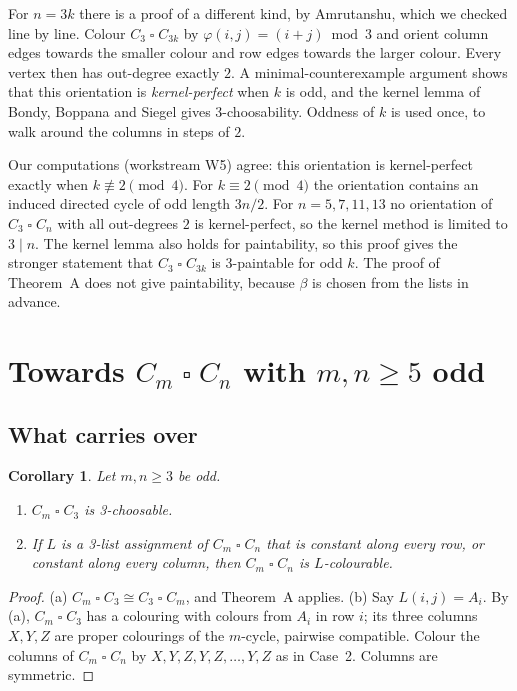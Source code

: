 \documentclass[11pt]{article}
\theoremstyle{plain}
\newtheorem{corollary}[theorem]{Corollary}
\theoremstyle{definition}
\theoremstyle{remark}
\newcommand{\T}{\mathbin{\square}}
\begin{document}
For $n = 3k$ there is a proof of a different kind, by Amrutanshu, which we checked line by
line. Colour $C_3 \T C_{3k}$ by $\varphi(i,j) = (i + j) \bmod 3$ and orient column edges towards
the smaller colour and row edges towards the larger colour. Every vertex then has out-degree
exactly $2$. A minimal-counterexample argument shows that this orientation is
\emph{kernel-perfect} when $k$ is odd, and the kernel lemma of Bondy, Boppana and Siegel gives
3-choosability. Oddness of $k$ is used once, to walk around the columns in steps of $2$.

Our computations (workstream W5) agree: this orientation is kernel-perfect exactly when
$k \not\equiv 2 \pmod 4$. For $k \equiv 2 \pmod 4$ the orientation contains an induced directed
cycle of odd length $3n/2$. For $n = 5, 7, 11, 13$ no orientation of $C_3 \T C_n$ with all
out-degrees $2$ is kernel-perfect, so the kernel method is limited to $3 \mid n$. The kernel lemma
also holds for paintability, so this proof gives the stronger statement that $C_3 \T C_{3k}$ is
3-paintable for odd $k$. The proof of Theorem~A does not give paintability, because $\beta$ is
chosen from the lists in advance.

\section{Towards $C_m \T C_n$ with $m, n \ge 5$ odd}\label{sec:general}

\subsection{What carries over}

\begin{corollary}\label{cor:rowconst}
Let $m, n \ge 3$ be odd.
\begin{enumerate}[label=(\alph*),nosep]
\item $C_m \T C_3$ is 3-choosable.
\item If $L$ is a 3-list assignment of $C_m \T C_n$ that is constant along every row, or constant
along every column, then $C_m \T C_n$ is $L$-colourable.
\end{enumerate}
\end{corollary}

\begin{proof}
(a) $C_m \T C_3 \cong C_3 \T C_m$, and Theorem~A applies. (b) Say $L(i, j) = A_i$. By (a),
$C_m \T C_3$ has a colouring with colours from $A_i$ in row $i$; its three columns $X, Y, Z$ are
proper colourings of the $m$-cycle, pairwise compatible. Colour the columns of $C_m \T C_n$ by
$X, Y, Z, Y, Z, \dots, Y, Z$ as in Case~2. Columns are symmetric.
\end{proof}
\end{document}
